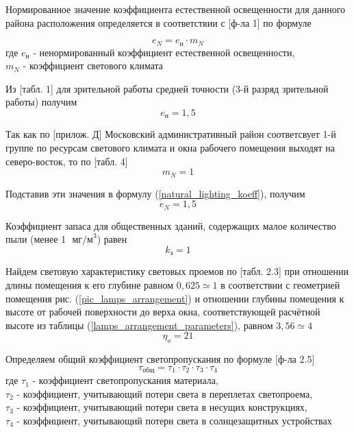 Нормированное значение коэффициента естественной освещенности для данного
района расположения определяется в соответствии с \cite{ecology_snip_23_05_95}[ф-ла 1]
по формуле

\begin{equation}
    e_N = e_\text{н} \cdot m_N
    \label{natural_lighting_koeff}
\end{equation}
где $e_\text{н}$ - ненормированный коэффициент естественной освещенности, \\
$m_N$ - коэффициент светового климата

Из \cite{ecology_snip_23_05_95}[табл. 1] для зрительной работы средней точности
(3-й разряд зрительной работы) получим
$$
    e_\text{н} = 1,5
$$

Так как по \cite{ecology_snip_23_05_95}[прилож. Д] Московский административный
район соответсвует 1-й группе по ресурсам светового климата и окна рабочего
помещения выходят на северо-восток, то по \cite{ecology_snip_23_05_95}[табл. 4]
$$
    m_N = 1
$$

Подставив эти значения в формулу (\ref{natural_lighting_koeff}), получим
$$
    e_N = 1,5
$$

Коэффициент запаса для общественных зданий, содержащих малое количество пыли
(менее 1 $\text{ мг/м}^3$) равен
$$
    k_\text{з} = 1
$$

Найдем световую характеристику световых проемов по
\cite{lighting_calc_method}[табл. 2.3] при отношении длины помещения к его глубине
равном $0,625 \simeq 1$ в соответствии с геометрией помещения рис. (\ref{pic_lamps_arrangement})
и отношении глубины помещения к высоте от рабочей поверхности до верха окна,
соответствующей расчётной высоте из таблицы (\ref{lamps_arrangement_parameters}),
равном $3,56 \simeq 4$
$$
    \eta_o = 21
$$

Определяем общий коэффициент светопропускания по формуле
\cite{lighting_calc_method}[ф-ла 2.5]
\begin{equation}
    \tau_\text{общ} = \tau_1 \cdot \tau_2 \cdot \tau_3 \cdot \tau_4
    \label{overall_light_pass_koeff}
\end{equation}
где $\tau_1$ - коэффициент светопропускания материала,                          \\
$\tau_2$ - коэффициент, учитывающий потери света в переплетах светопроема,      \\
$\tau_3$ - коэффициент, учитывающий потери света в несущих конструкциях,        \\
$\tau_4$ - коэффициент, учитывающий потери света в солнцезащитных устройствах

